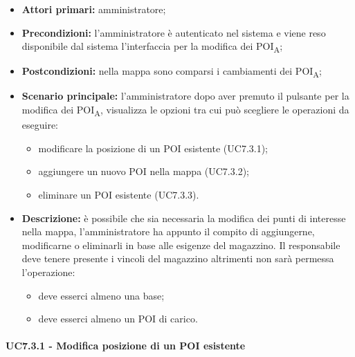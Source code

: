 \begin{itemize}

\item   \textbf{Attori primari:} amministratore;

 \item   \textbf{Precondizioni:} l'amministratore è autenticato nel sistema e viene reso disponibile dal sistema l'interfaccia per la modifica dei POI\textsubscript{A};

 \item   \textbf{Postcondizioni:} nella mappa sono comparsi i cambiamenti dei POI\textsubscript{A}; 

\item   \textbf{Scenario principale:} l'amministratore dopo aver premuto il pulsante per la modifica dei POI\textsubscript{A}, visualizza le opzioni tra cui può scegliere le operazioni da eseguire:

  \begin{itemize}

    \item modificare la posizione di un POI esistente (UC7.3.1);

    \item aggiungere un nuovo POI nella mappa (UC7.3.2);

   \item eliminare un POI esistente (UC7.3.3).

 \end{itemize}

\item   \textbf{Descrizione:} è possibile che sia necessaria la modifica dei punti di interesse nella mappa, l'amministratore ha appunto il compito di aggiungerne, modificarne o eliminarli in base alle esigenze del magazzino. Il responsabile deve tenere presente i vincoli del magazzino altrimenti non sarà permessa l'operazione:

  \begin{itemize}

\item deve esserci almeno una base;

\item deve esserci almeno un POI di carico.

\end{itemize}

\end{itemize}



\paragraph{UC7.3.1 - Modifica posizione di un POI esistente}



